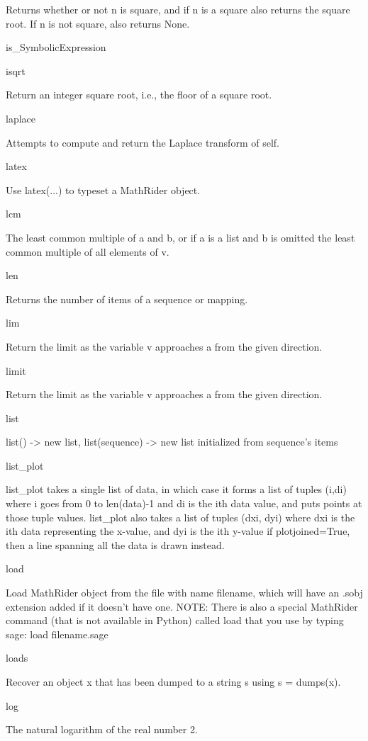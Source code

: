 \documentclass[12pt,oneside]{book}
\begin{document}
Returns whether or not n is square, and if n is a square also returns the square root. If n is not square, also returns None.

is\_SymbolicExpression


isqrt

Return an integer square root, i.e., the floor of a square root.

laplace

Attempts to compute and return the Laplace transform of self.

latex

Use latex(...) to typeset a MathRider object.

lcm

The least common multiple of a and b, or if a is a list and b is omitted the least common multiple of all elements of v.

len

Returns the number of items of a sequence or mapping.

lim

Return the limit as the variable v approaches a from the given direction.

limit

Return the limit as the variable v approaches a from the given direction.

list

list() {}-{\textgreater} new list, list(sequence) {}-{\textgreater} new list initialized from sequence's items

list\_plot

list\_plot takes a single list of data, in which case it forms a list of tuples (i,di) where i goes from 0 to len(data){}-1 and di is the ith data value, and puts points at those tuple values. list\_plot also takes a list of tuples (dxi, dyi) where dxi is the ith data representing the x{}-value, and dyi is the ith y{}-value if plotjoined=True, then a line spanning all the data is drawn instead.

load

Load MathRider object from the file with name filename, which will have an .sobj extension added if it doesn't have one. NOTE: There is also a special MathRider command (that is not available in Python) called load that you use by typing sage: load filename.sage

loads

Recover an object x that has been dumped to a string s using s = dumps(x).

log

The natural logarithm of the real number 2.
\end{document}
